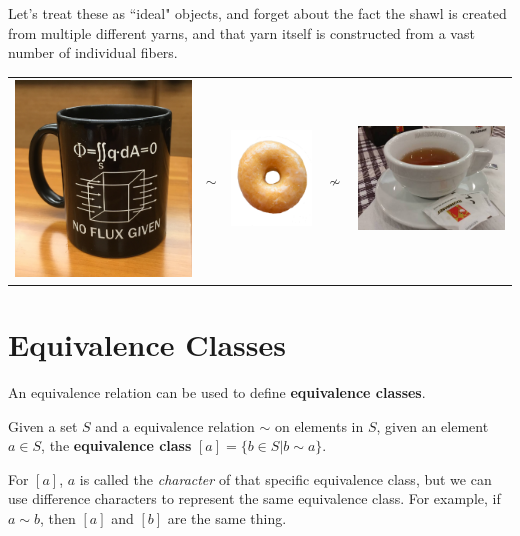 Let's treat these as ``ideal" objects, and forget about the fact the shawl is created from multiple different yarns, and that yarn itself is constructed from a vast number of individual fibers.


\begin{tabular}{c c c c c}
\includegraphics[width=.2\textwidth,align=c]{pics/mug.JPG} &
{\fontsize{50}{60}\selectfont $\sim$} &
\includegraphics[width=.2\textwidth,align=c]{pics/donut.png}\protect\footnotemark &
{\fontsize{50}{60}\selectfont $\nsim$} &
\includegraphics[width=.2\textwidth,align=c]{pics/not_a_donut.jpg} \\
\end{tabular}

\section{Equivalence Classes}

An equivalence relation can be used to define \textbf{equivalence classes}.

\begin{definition}
  Given a set $S$ and a equivalence relation $\sim$ on elements in $S$, given an element $a\in S$, the \textbf{equivalence class} $[ a ] = \{ b \in S | b \sim a\}$.
\end{definition}

For $[a]$, $a$ is called the \textit{character} of that specific equivalence class, but we can use difference characters to represent the same equivalence class.  For example, if $a\sim b$, then $[a]$ and $[b]$ are the same thing.

